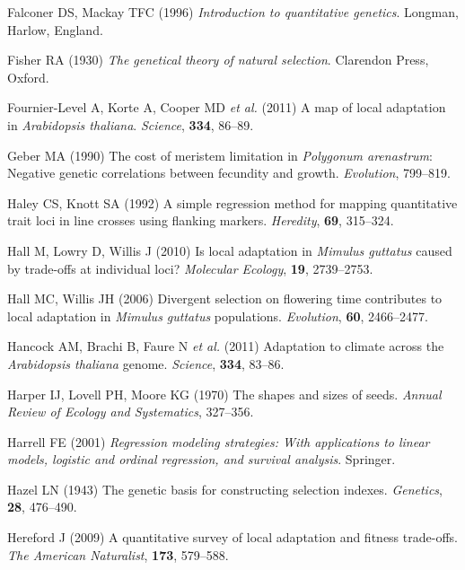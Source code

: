 \documentclass[12pt,]{article}
\begin{document}
\leavevmode\hypertarget{ref-Falconer1996}{}%
Falconer DS, Mackay TFC (1996) \emph{Introduction to quantitative genetics}. Longman, Harlow, England.

\leavevmode\hypertarget{ref-Fisher1930}{}%
Fisher RA (1930) \emph{The genetical theory of natural selection}. Clarendon Press, Oxford.

\leavevmode\hypertarget{ref-fournier2011map}{}%
Fournier-Level A, Korte A, Cooper MD \emph{et al.} (2011) A map of local adaptation in \emph{Arabidopsis thaliana}. \emph{Science}, \textbf{334}, 86--89.

\leavevmode\hypertarget{ref-Geber1990}{}%
Geber MA (1990) The cost of meristem limitation in \emph{Polygonum arenastrum}: Negative genetic correlations between fecundity and growth. \emph{Evolution}, 799--819.

\leavevmode\hypertarget{ref-Haley1992}{}%
Haley CS, Knott SA (1992) A simple regression method for mapping quantitative trait loci in line crosses using flanking markers. \emph{Heredity}, \textbf{69}, 315--324.

\leavevmode\hypertarget{ref-Hall2010}{}%
Hall M, Lowry D, Willis J (2010) Is local adaptation in \emph{Mimulus guttatus} caused by trade-offs at individual loci? \emph{Molecular Ecology}, \textbf{19}, 2739--2753.

\leavevmode\hypertarget{ref-Hall2006}{}%
Hall MC, Willis JH (2006) Divergent selection on flowering time contributes to local adaptation in \emph{Mimulus guttatus} populations. \emph{Evolution}, \textbf{60}, 2466--2477.

\leavevmode\hypertarget{ref-hancock2011adaptation}{}%
Hancock AM, Brachi B, Faure N \emph{et al.} (2011) Adaptation to climate across the \emph{Arabidopsis thaliana} genome. \emph{Science}, \textbf{334}, 83--86.

\leavevmode\hypertarget{ref-Harper1970}{}%
Harper IJ, Lovell PH, Moore KG (1970) The shapes and sizes of seeds. \emph{Annual Review of Ecology and Systematics}, 327--356.

\leavevmode\hypertarget{ref-harrell2001regression}{}%
Harrell FE (2001) \emph{Regression modeling strategies: With applications to linear models, logistic and ordinal regression, and survival analysis}. Springer.

\leavevmode\hypertarget{ref-Hazel1943}{}%
Hazel LN (1943) The genetic basis for constructing selection indexes. \emph{Genetics}, \textbf{28}, 476--490.

\leavevmode\hypertarget{ref-Hereford2009}{}%
Hereford J (2009) A quantitative survey of local adaptation and fitness trade-offs. \emph{The American Naturalist}, \textbf{173}, 579--588.
\end{document}
